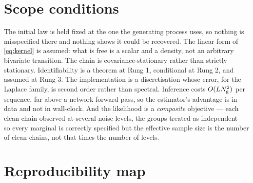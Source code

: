 \section{Scope conditions}
\label{app:limits}

The initial law is held fixed at the one the generating process uses, so nothing is misspecified
there and nothing shows it could be recovered. The linear form of \eqref{eq:kernel} is assumed:
what is free is a scalar and a density, not an arbitrary bivariate transition. The chain is
covariance-stationary rather than strictly stationary. Identifiability is a theorem at Rung 1,
conditional at Rung 2, and assumed at Rung 3. The implementation is a discretisation whose error,
for the Laplace family, is second order rather than spectral. Inference costs
$O(LN_{\mathrm{g}}^{2})$ per sequence, far above a network forward pass, so the estimator's advantage
is in data and not in wall-clock. And the likelihood is a \emph{composite} objective --- each clean
chain observed at several noise levels, the groups treated as independent --- so every marginal is
correctly specified but the effective sample size is the number of clean chains, not that times
the number of levels.

\section{Reproducibility map}
\label{app:repro}

